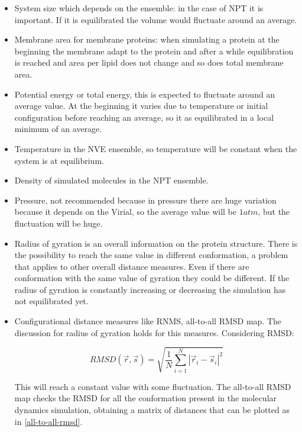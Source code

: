 \begin{multicols}{2}
	\begin{itemize}
		\item System size which depends on the ensemble: in the case of NPT it is important.
			If it is equilibrated the volume would fluctuate around an average.
		\item Membrane area for membrane proteins: when simulating a protein at the beginning the membrane adapt to the protein and after a while equilibration is reached and area per lipid does not change and so does total membrane area.
		\item Potential energy or total energy, this is expected to fluctuate around an average value.
			At the beginning it varies due to temperature or initial configuration before reaching an average, so it as equilibrated in a local minimum of an average.
		\item Temperature in the NVE ensemble, so temperature will be constant when the system is at equilibrium.
		\item Density of simulated molecules in the NPT ensemble.
		\item Pressure, not recommended because in pressure there are huge variation because it depends on the Virial, so the average value will be $1 atm$, but the fluctuation will be huge.
		\item Radius of gyration is an overall information on the protein structure.
			There is the possibility to reach the same value in different conformation, a problem that applies to other overall distance measures.
			Even if there are conformation with the same value of gyration they could be different.
			If the radius of gyration is constantly increasing or decreasing the simulation has not equilibrated yet.
		\item Configurational distance measures like RNMS, all-to-all RMSD map.
			The discussion for radius of gyration holds for this measures.
			Considering RMSD:

			$$RMSD(\vec{r}, \vec{s}) = \sqrt{\frac{1}{N}\sum\limits_{i=1}^N|\vec{r}_i-\vec{s}_i|^2}$$

			This will reach a constant value with some fluctuation.
			The all-to-all RMSD map checks the RMSD for all the conformation present in the molecular dynamics simulation, obtaining a matrix of distances that can be plotted as in \ref{all-to-all-rmsd}.
	\end{itemize}
\end{multicols}

